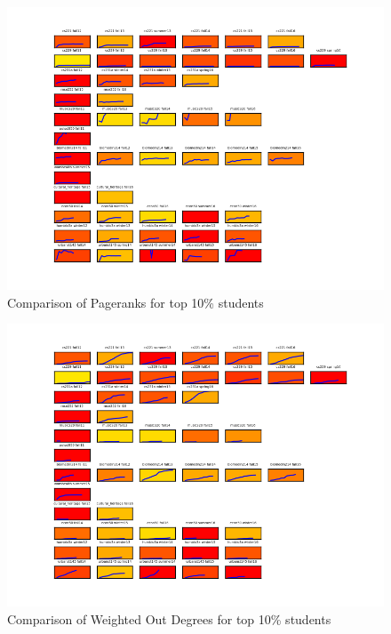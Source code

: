 \begin{figure}[htp]
       \centering
       \includegraphics[width=1\textwidth]{Figs/pagerank_sm_color.png}
       \caption{\textnormal{Comparison of Pageranks for top 10\% students}}
       \label{fig:womenHealth}
\end{figure}

\begin{figure}[htp]
       \centering
       \includegraphics[width=1\textwidth]{Figs/weighted_out_degree_sm_color.png}
       \caption{\textnormal{Comparison of Weighted Out Degrees for top 10\% students}}
       \label{fig:womenHealth}
\end{figure}

